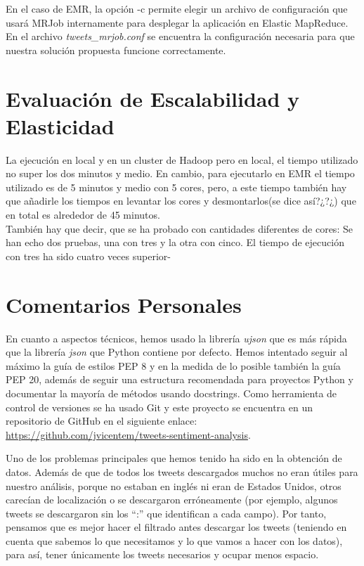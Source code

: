 \documentclass[12pt,a4paper]{article}
\begin{document}
En el caso de EMR, la opción -c permite elegir un archivo de configuración que usará MRJob internamente para desplegar la aplicación en Elastic MapReduce. En el archivo \textit{tweets\_mrjob.conf} se encuentra la configuración necesaria para que nuestra solución propuesta funcione correctamente.

\section{Evaluación de Escalabilidad y Elasticidad}

La ejecución en local y en un cluster de Hadoop pero en local, el tiempo  utilizado no super los dos minutos y medio. En cambio, para ejecutarlo en EMR el tiempo utilizado es de 5 minutos y medio con 5 cores, pero, a este tiempo también hay que añadirle los tiempos en levantar los cores y desmontarlos(se dice así?¿?¿) que en total es alrededor de 45 minutos.\\

También hay que decir, que se ha probado con cantidades diferentes de cores: Se han echo dos pruebas, una con tres y la otra con cinco. El tiempo de ejecución con tres ha sido cuatro veces superior-

\section{Comentarios Personales}

En cuanto a aspectos técnicos, hemos usado la librería \textit{ujson} que es más rápida que la librería \textit{json} que Python contiene por defecto. Hemos intentado seguir al máximo la guía de estilos PEP 8 y en la medida de lo posible también la guía PEP 20, además de seguir una estructura recomendada para proyectos Python y documentar la mayoría de métodos usando docstrings.
Como herramienta de control de versiones se ha usado Git y este proyecto se encuentra en un repositorio de GitHub en el siguiente enlace: \url{https://github.com/jvicentem/tweets-sentiment-analysis}.

Uno de los problemas principales que hemos tenido ha sido en la obtención de datos. Además de que de todos los tweets descargados muchos no eran útiles para nuestro análisis, porque no estaban en inglés ni eran de Estados Unidos, otros carecían de localización o se descargaron erróneamente (por ejemplo, algunos tweets se descargaron sin los ``:'' que identifican a cada campo). Por tanto, pensamos que es mejor hacer el filtrado antes descargar los tweets (teniendo en cuenta que sabemos lo que necesitamos y lo que vamos a hacer con los datos), para así, tener únicamente los tweets necesarios y ocupar menos espacio.\\
\end{document}
